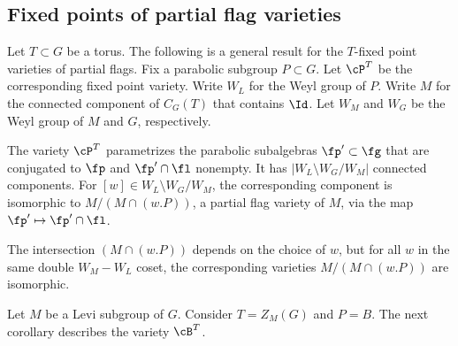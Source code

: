 \documentclass[12pt]{amsart}
\begin{document}
\subsection{Fixed points of partial flag varieties}
Let $T\subset G$ be a torus. The following is a general result for the $T$-fixed point varieties of partial flags. Fix a parabolic subgroup $P\subset G$. Let $\cP^{T}$ be the corresponding fixed point variety. Write $W_L$ for the Weyl group of $P$. Write $M$ for the connected component of $C_G(T)$ that contains $\Id$. Let $W_M$ and $W_G$ be the Weyl group of $M$ and $G$, respectively. 
\begin{prop}\label{fixed pt of partial flag}\cite[Proposition 3.3]{Steinberg1976}
    The variety $\cP^{T}$ parametrizes the parabolic subalgebras $\fp'\subset \fg$ that are conjugated to $\fp$ and $\fp'\cap \fl$ nonempty. It has $|W_L\setminus W_G/ W_M|$ connected components. For $[w]\in W_L\setminus W_G/ W_M$, the corresponding component is isomorphic to $M/(M\cap (w.P))$, a partial flag variety of $M$, via the map $\fp'\mapsto \fp'\cap \fl$.
    
\end{prop}
\begin{rmk}
    The intersection $(M\cap (w.P))$ depends on the choice of $w$, but for all $w$ in the same double $W_M-W_L$ coset, the corresponding varieties $M/(M\cap (w.P))$ are isomorphic.
\end{rmk}

Let $M$ be a Levi subgroup of $G$. Consider $T= Z_M(G)$ and $P= B$. The next corollary describes the variety $\cB^T$. 
\end{document}
